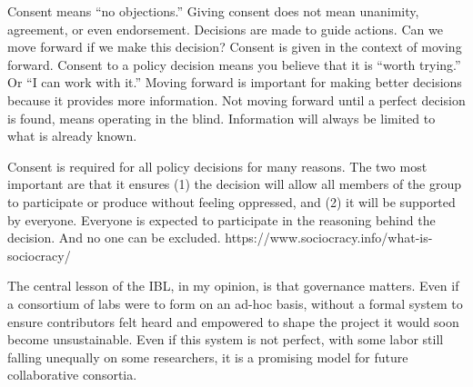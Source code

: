 \documentclass[10pt]{article}
\begin{document}
\begin{multicols}{2}
\begin{leftbar}
Consent means ``no objections.'' Giving consent does not mean unanimity,
agreement, or even endorsement. Decisions are made to guide actions. Can
we move forward if we make this decision? Consent is given in the
context of moving forward. Consent to a policy decision means you
believe that it is ``worth trying.'' Or ``I can work with it.'' Moving
forward is important for making better decisions because it provides
more information. Not moving forward until a perfect decision is found,
means operating in the blind. Information will always be limited to what
is already known.

Consent is required for all policy decisions for many reasons. The two
most important are that it ensures (1) the decision will allow all
members of the group to participate or produce without feeling
oppressed, and (2) it will be supported by everyone. Everyone is
expected to participate in the reasoning behind the decision. And no one
can be excluded. https://www.sociocracy.info/what-is-sociocracy/
\end{leftbar}

The central lesson of the IBL, in my opinion, is that governance
matters. Even if a consortium of labs were to form on an ad-hoc basis,
without a formal system to ensure contributors felt heard and empowered
to shape the project it would soon become unsustainable. Even if this
system is not perfect, with some labor still falling unequally on some
researchers, it is a promising model for future collaborative consortia.


\end{multicols}
\end{document}

